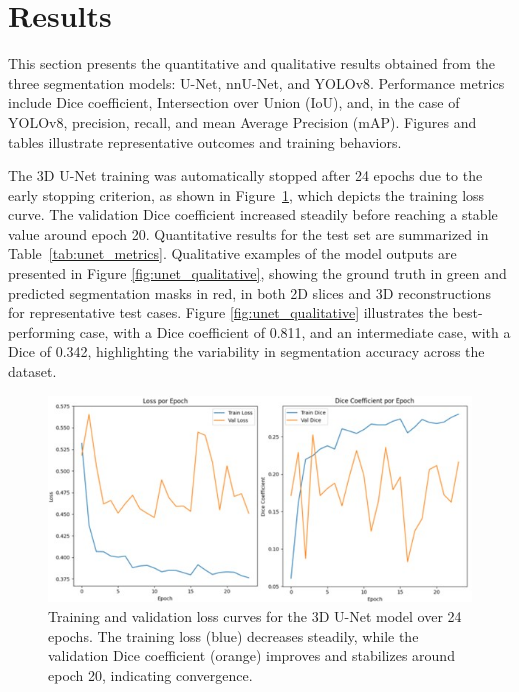 \documentclass[12pt]{article}
\begin{document}



\section{Results}\label{sec:results}

This section presents the quantitative and qualitative results obtained from the three segmentation models: U-Net, nnU-Net, and YOLOv8. Performance metrics include Dice coefficient, Intersection over Union (IoU), and, in the case of YOLOv8, precision, recall, and mean Average Precision (mAP). Figures and tables illustrate representative outcomes and training behaviors.


The 3D U-Net training was automatically stopped after 24 epochs due to the early stopping criterion, as shown in Figure~\ref{fig:unet_loss_curve}, which depicts the training loss curve. The validation Dice coefficient increased steadily before reaching a stable value around epoch 20. Quantitative results for the test set are summarized in Table~\ref{tab:unet_metrics}.
%
Qualitative examples of the model outputs are presented in Figure \ref{fig:unet_qualitative}, showing the ground truth in green and predicted segmentation masks in red, in both 2D slices and 3D reconstructions for representative test cases. Figure \ref{fig:unet_qualitative} illustrates the best-performing case, with a Dice coefficient of 0.811, and an intermediate case, with a Dice of 0.342, highlighting the variability in segmentation accuracy across the dataset.

\begin{figure}[tp]
    \centering
    \includegraphics[width=\textwidth]{figures/Figure 1.jpg}
    \caption{Training and validation loss curves for the 3D U-Net model over 24 epochs. The training loss (blue) decreases steadily, while the validation Dice coefficient (orange) improves and stabilizes around epoch 20, indicating convergence.}\label{fig:unet_loss_curve}
\end{figure}
\end{document}

